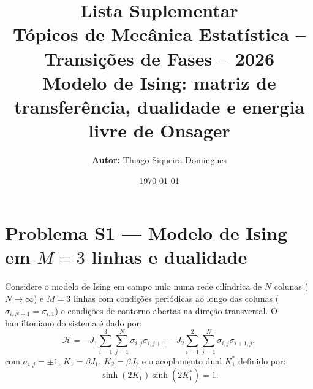 \documentclass[11pt,a4paper]{article}
\title{Lista Suplementar\\[2pt]
{\large Tópicos de Mecânica Estatística -- Transições de Fases -- 2026}\\[0.2cm]
\large Modelo de Ising: matriz de transferência, dualidade e energia livre de Onsager}
\author{\textbf{Autor:} Thiago Siqueira Domingues}
\date{\today}
\begin{document}
\maketitle
\section*{Problema S1 --- Modelo de Ising em $M=3$ linhas e dualidade}
%
Considere o modelo de Ising em campo nulo numa rede cilíndrica de $N$ colunas ($N \to \infty$) e $M=3$ linhas com condições periódicas ao longo das colunas ($\sigma_{i,N+1} = \sigma_{i,1}$) e condições de contorno abertas na direção transversal. O hamiltoniano do sistema é dado por:
%
\begin{equation}
    \mathcal{H} = -J_1 \sum_{i=1}^{3} \sum_{j=1}^{N} \sigma_{i,j} \sigma_{i,j+1} - J_2 \sum_{i=1}^{2} \sum_{j=1}^{N} \sigma_{i,j} \sigma_{i+1,j},
    \label{eq:H_M3}
\end{equation}
%
com $\sigma_{i,j} = \pm 1$, $K_1 = \beta J_1$, $K_2 = \beta J_2$ e o acoplamento dual $K_1^*$ definido por:
%
\begin{equation}
    \sinh(2K_1) \sinh(2K_1^*) = 1.
    \label{eq:dual_K1}
\end{equation}
%
\end{document}
